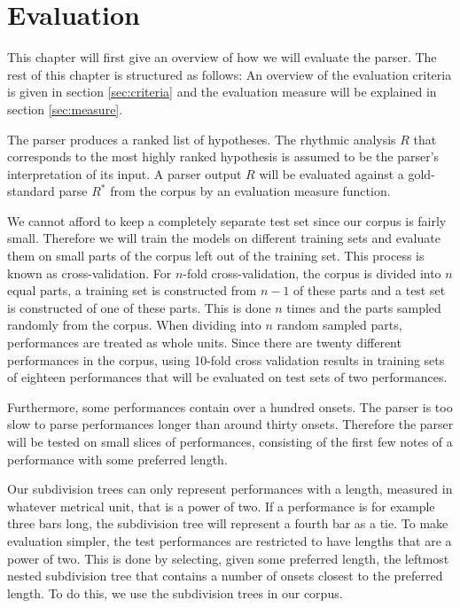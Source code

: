 \chapter{Evaluation}
\label{sec:evaluation}


This chapter will first give an overview of how we will evaluate the parser. The rest of this chapter is structured as follows: An overview of the evaluation criteria is given in section \ref{sec:criteria} and the evaluation measure will be explained in section \ref{sec:measure}. 

The parser produces a ranked list of hypotheses. The rhythmic analysis $R$ that corresponds to the most highly ranked hypothesis is assumed to be the parser's interpretation of its input. A parser output $R$ will be evaluated against a gold-standard parse $R^*$ from the corpus by an evaluation measure function. 

We cannot afford to keep a completely separate test set since our corpus is fairly small. Therefore we will train the models on different training sets and evaluate them on small parts of the corpus left out of the training set. This process is known as cross-validation. For $n$-fold cross-validation, the corpus is divided into $n$ equal parts, a training set is constructed from $n-1$ of these parts and a test set is constructed of one of these parts. This is done $n$ times and the parts sampled randomly from the corpus. When dividing into $n$ random sampled parts, performances are treated as whole units. Since there are twenty different performances in the corpus, using 10-fold cross validation results in training sets of eighteen performances that will be evaluated on test sets of two performances.

Furthermore, some performances contain over a hundred onsets. The parser is too slow to parse performances longer than around thirty onsets. Therefore the parser will be tested on small slices of performances, consisting of the first few notes of a performance with some preferred length.

Our subdivision trees can only represent performances with a length, measured in whatever metrical unit, that is a power of two. If a performance is for example three bars long, the subdivision tree will represent a fourth bar as a tie. To make evaluation simpler, the test performances are restricted to have lengths that are a power of two. This is done by selecting, given some preferred length, the leftmost nested subdivision tree that contains a number of onsets closest to the preferred length. To do this, we use the subdivision trees in our corpus.

